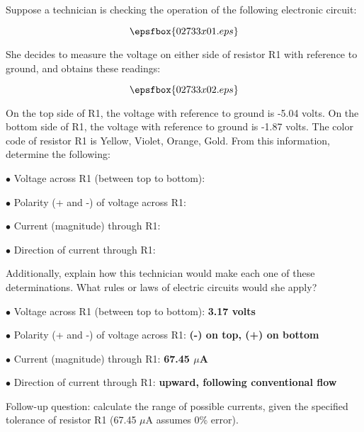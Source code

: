 

Suppose a technician is checking the operation of the following electronic circuit:

$$\epsfbox{02733x01.eps}$$

She decides to measure the voltage on either side of resistor R1 with reference to ground, and obtains these readings:

$$\epsfbox{02733x02.eps}$$

On the top side of R1, the voltage with reference to ground is -5.04 volts.  On the bottom side of R1, the voltage with reference to ground is -1.87 volts.  The color code of resistor R1 is Yellow, Violet, Orange, Gold.  From this information, determine the following:

\medskip
\goodbreak
\item{$\bullet$} Voltage across R1 (between top to bottom):
\item{$\bullet$} Polarity (+ and -) of voltage across R1:
\item{$\bullet$} Current (magnitude) through R1:
\item{$\bullet$} Direction of current through R1:
\medskip

Additionally, explain how this technician would make each one of these determinations.  What rules or laws of electric circuits would she apply?







\medskip
\item{$\bullet$} Voltage across R1 (between top to bottom): {\bf 3.17 volts}
\item{$\bullet$} Polarity (+ and -) of voltage across R1: {\bf (-) on top, (+) on bottom}
\item{$\bullet$} Current (magnitude) through R1: {\bf 67.45 $\mu$A}
\item{$\bullet$} Direction of current through R1: {\bf upward, following conventional flow}
\medskip

\vskip 10pt

Follow-up question: calculate the range of possible currents, given the specified tolerance of resistor R1 (67.45 $\mu$A assumes 0\% error).

